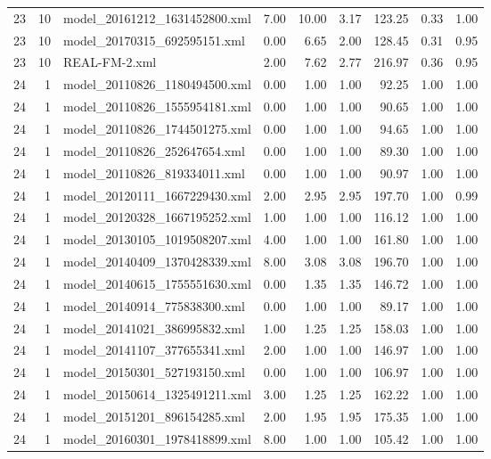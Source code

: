 \begin{table}[ht]
\begin{tabular}{rrlrrrrrr}
   23 &  10 & model\_20161212\_1631452800.xml & 7.00 & 10.00 & 3.17 & 123.25 & 0.33 & 1.00 \\ 
   23 &  10 & model\_20170315\_692595151.xml & 0.00 & 6.65 & 2.00 & 128.45 & 0.31 & 0.95 \\ 
   23 &  10 & REAL-FM-2.xml & 2.00 & 7.62 & 2.77 & 216.97 & 0.36 & 0.95 \\ 
   24 &   1 & model\_20110826\_1180494500.xml & 0.00 & 1.00 & 1.00 & 92.25 & 1.00 & 1.00 \\ 
   24 &   1 & model\_20110826\_1555954181.xml & 0.00 & 1.00 & 1.00 & 90.65 & 1.00 & 1.00 \\ 
   24 &   1 & model\_20110826\_1744501275.xml & 0.00 & 1.00 & 1.00 & 94.65 & 1.00 & 1.00 \\ 
   24 &   1 & model\_20110826\_252647654.xml & 0.00 & 1.00 & 1.00 & 89.30 & 1.00 & 1.00 \\ 
   24 &   1 & model\_20110826\_819334011.xml & 0.00 & 1.00 & 1.00 & 90.97 & 1.00 & 1.00 \\ 
   24 &   1 & model\_20120111\_1667229430.xml & 2.00 & 2.95 & 2.95 & 197.70 & 1.00 & 0.99 \\ 
   24 &   1 & model\_20120328\_1667195252.xml & 1.00 & 1.00 & 1.00 & 116.12 & 1.00 & 1.00 \\ 
   24 &   1 & model\_20130105\_1019508207.xml & 4.00 & 1.00 & 1.00 & 161.80 & 1.00 & 1.00 \\ 
   24 &   1 & model\_20140409\_1370428339.xml & 8.00 & 3.08 & 3.08 & 196.70 & 1.00 & 1.00 \\ 
   24 &   1 & model\_20140615\_1755551630.xml & 0.00 & 1.35 & 1.35 & 146.72 & 1.00 & 1.00 \\ 
   24 &   1 & model\_20140914\_775838300.xml & 0.00 & 1.00 & 1.00 & 89.17 & 1.00 & 1.00 \\ 
   24 &   1 & model\_20141021\_386995832.xml & 1.00 & 1.25 & 1.25 & 158.03 & 1.00 & 1.00 \\ 
   24 &   1 & model\_20141107\_377655341.xml & 2.00 & 1.00 & 1.00 & 146.97 & 1.00 & 1.00 \\ 
   24 &   1 & model\_20150301\_527193150.xml & 0.00 & 1.00 & 1.00 & 106.97 & 1.00 & 1.00 \\ 
   24 &   1 & model\_20150614\_1325491211.xml & 3.00 & 1.25 & 1.25 & 162.22 & 1.00 & 1.00 \\ 
   24 &   1 & model\_20151201\_896154285.xml & 2.00 & 1.95 & 1.95 & 175.35 & 1.00 & 1.00 \\ 
   24 &   1 & model\_20160301\_1978418899.xml & 8.00 & 1.00 & 1.00 & 105.42 & 1.00 & 1.00 \\ 

\end{tabular}
\end{table}
